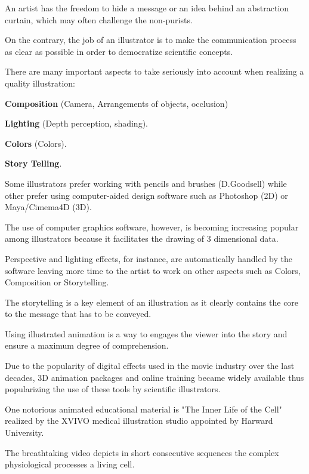 An artist has the freedom to hide a message or an idea behind an abstraction curtain, which may often challenge the non-purists.

On the contrary, the job of an illustrator is to make the communication process as clear as possible in order to democratize scientific concepts.

There are many important aspects to take seriously into account when realizing a quality illustration:

\textbf{Composition} (Camera, Arrangements of objects, occlusion)

\textbf{Lighting} (Depth perception, shading).

\textbf{Colors} (Colors).

\textbf{Story Telling}.

Some illustrators prefer working with pencils and brushes (D.Goodsell) while other prefer using computer-aided design software such as Photoshop (2D) or Maya/Cimema4D (3D).

The use of computer graphics software, however, is becoming increasing popular among illustrators because it facilitates the drawing of 3 dimensional data.

Perspective and lighting effects, for instance, are automatically handled by the software leaving more time to the artist to work on other aspects such as Colors, Composition or Storytelling.

The storytelling is a key element of an illustration as it clearly contains the core to the message that has to be conveyed.

Using illustrated animation is a way to engages the viewer into the story and ensure a maximum degree of comprehension.


Due to the popularity of digital effects used in the movie industry over the last decades, 3D animation packages and online training became widely available thus popularizing the use of these tools by scientific illustrators.

One notorious animated educational material is "The Inner Life of the Cell" realized by the XVIVO medical illustration studio appointed by Harward University.

The breathtaking video depicts in short consecutive sequences the complex physiological processes a living cell.

